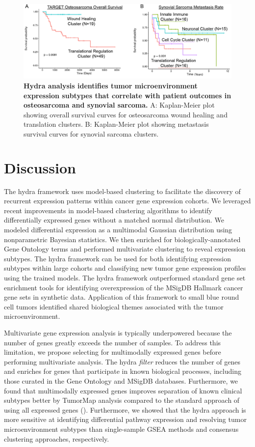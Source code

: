 \documentclass[10pt,letterpaper]{article}
\begin{document}
\begin{figure}[!h]
	\includegraphics[width=\textwidth]{img/PNG/osteosarcoma-synovial-survival-2x}
	\caption{{\bf Hydra analysis identifies tumor microenvironment expression subtypes that correlate with patient outcomes in osteosarcoma and synovial sarcoma.} A: Kaplan-Meier plot showing overall survival curves for osteosarcoma wound healing and translation clusters. B: Kaplan-Meier plot showing metastasis survival curves for synovial sarcoma clusters.}
	\label{surv}
\end{figure}

\section*{Discussion}
The hydra framework uses model-based clustering to facilitate the discovery of recurrent expression patterns within cancer gene expression cohorts. We leveraged recent improvements in model-based clustering algorithms to identify differentially expressed genes without a matched normal distribution. We modeled differential expression as a multimodal Gaussian distribution using nonparametric Bayesian statistics. We then enriched for biologically-annotated Gene Ontology terms and performed multivariate clustering to reveal expression subtypes. The hydra framework can be used for both identifying expression subtypes within large cohorts and classifying new tumor gene expression profiles using the trained models. The hydra framework outperformed standard gene set enrichment tools for identifying overexpression of the MSigDB Hallmark cancer gene sets in synthetic data. Application of this framework to small blue round cell tumors identified shared biological themes associated with the tumor microenvironment.

Multivariate gene expression analysis is typically underpowered because the number of genes greatly exceeds the number of samples. To address this limitation, we propose selecting for multimodally expressed genes before performing multivariate analysis. The hydra \textit{filter} reduces the number of genes and enriches for genes that participate in known biological processes, including those curated in the Gene Ontology and MSigDB databases. Furthermore, we found that multimodally expressed genes improves separation of known clinical subtypes better by TumorMap analysis compared to the standard approach of using all expressed genes (). Furthermore, we showed that the hydra approach is more sensitive at identifying differential pathway expression and resolving tumor microenvironment subtypes than single-sample GSEA methods and consensus clustering approaches, respectively.
\end{document}
